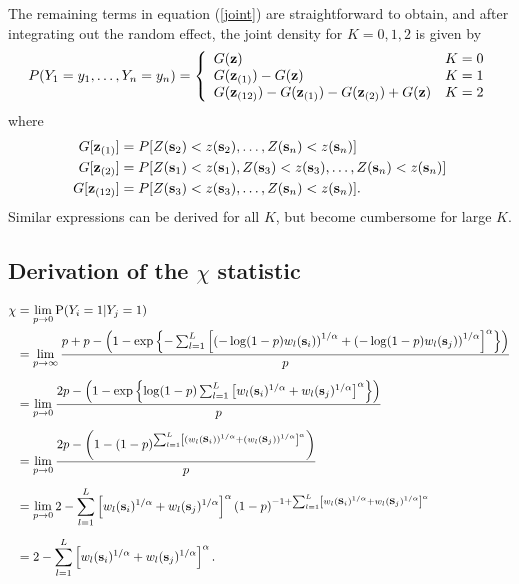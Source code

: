 \documentclass[11pt]{article}
\begin{document}
The remaining terms in equation (\ref{joint}) are straightforward to obtain, and after integrating out the random effect, the joint density for $K = 0, 1, 2$ is given by
\begin{align}\label{pmf}
  P(Y_1=y_1,\ldots,Y_n=y_n) =  \left\{
    \begin{array}{ll}
      G(\mbox{\bf z}) & K=0 \\
      G(\mbox{\bf z}_{(1)})-G(\mbox{\bf z}) & K=1 \\
      G(\mbox{\bf z}_{(12)})-G(\mbox{\bf z}_{(1)})-G(\mbox{\bf z}_{(2)})+G(\mbox{\bf z}) & K=2
    \end{array}
  \right.
\end{align}
where
\begin{align*}
  G[\mbox{\bf z}_{(1)}] &= P[Z(\mbox{\bf s}_2)<z(\mbox{\bf s}_2),\ldots,Z(\mbox{\bf s}_n)<z(\mbox{\bf s}_n)] \\
  G[\mbox{\bf z}_{(2)}] &= P[Z(\mbox{\bf s}_1)<z(\mbox{\bf s}_1),Z(\mbox{\bf s}_3)<z(\mbox{\bf s}_3),\ldots,Z(\mbox{\bf s}_n)<z(\mbox{\bf s}_n)]\\
  G[\mbox{\bf z}_{(12)}] &= P[Z(\mbox{\bf s}_3)<z(\mbox{\bf s}_3),\ldots,Z(\mbox{\bf s}_n)<z(\mbox{\bf s}_n)].
\end{align*}
Similar expressions can be derived for all $K$, but become cumbersome for large $K$.

\subsection{Derivation of the $\chi$ statistic}\label{a:chi}
\begin{align} \label{chi}
  \chi &= \lim_{p \rightarrow 0 }\text{P}(Y_i = 1|Y_j = 1)\nonumber \\
   &= \lim_{p \rightarrow \infty }\frac{ p + p - \left( 1 - \exp \left \{ - \sum_{ l = 1 }^{ L } \left[ \left( -\log(1-p) w_{l}(\mbox{\bf s}_i) \right)^{ 1/\alpha } + \left( -\log(1 - p) w_{ l}(\mbox{\bf s}_j) \right)^{ 1/\alpha } \right]^{\alpha} \right \} \right) }{ p } \nonumber \\[0.5em]
  &= \lim_{p \rightarrow 0 } \frac{ 2p - \left( 1 - \exp \left \{ \log(1-p) \sum_{ l = 1 }^{ L } \left[  w_{l}(\mbox{\bf s}_i) ^{ 1/\alpha } +  w_{ l}(\mbox{\bf s}_j) ^{ 1/\alpha } \right]^{\alpha} \right \} \right) }{ p } \nonumber \\[0.5em]
  &= \lim_{p \rightarrow 0 } \frac{ 2p - \left( 1 - (1-p)^{ \sum_{ l = 1 }^{ L } \left[ \left( w_{l}(\mbox{\bf s}_i) \right)^{ 1/\alpha } + \left( w_{ l}(\mbox{\bf s}_j) \right)^{ 1/\alpha } \right]^\alpha } \right) }{ p } \nonumber \\[0.5em]
  &=\lim_{p \rightarrow 0 } 2 -\sum_{ l = 1 }^{ L } \left[ w_{l}(\mbox{\bf s}_i) ^{ 1/\alpha } +  w_{ l} (\mbox{\bf s}_j)^{ 1/\alpha } \right]^\alpha ( 1 - p)^{ -1 + \sum_{ l = 1 }^{ L } \left[  w_{l}(\mbox{\bf s}_i) ^{ 1/\alpha } +  w_{ l}(\mbox{\bf s}_j)^{ 1/\alpha } \right]^\alpha } \nonumber \\[0.5em]
  &= 2 -  \sum_{ l = 1 }^{ L } \left[ w_{l}(\mbox{\bf s}_i)^{ 1/\alpha } +  w_{ l}(\mbox{\bf s}_j) ^{ 1/\alpha } \right]^\alpha.
\end{align}

\begin{singlespace}


\end{singlespace}
\end{document}

